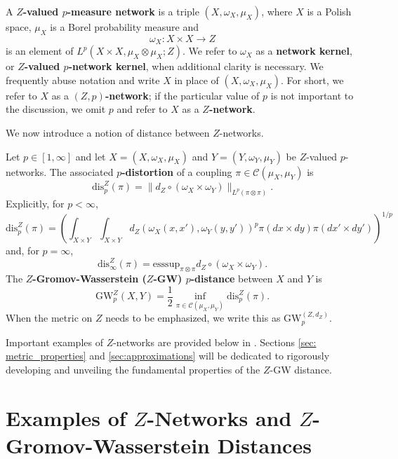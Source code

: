 \documentclass[twoside,11pt]{article}
\theoremstyle{definition}
\newcommand{\dgwz}{\mathrm{GW}_p^Z}
\newcommand{\disp}{\mathrm{dis}_p}
\newcommand{\define}[1]{\textbf{#1}}
\begin{document}
\begin{definition}[$Z$-Network]
    A \define{$Z$-valued $p$-measure network} is a triple $(X,\omega_X,\mu_X)$, where $X$ is a Polish space, $\mu_X$ is a Borel probability measure and
    \[
        \omega_X:X \times X \to Z
    \]
    is an element of $L^p(X\times X, \mu_X\otimes \mu_X; Z)$. We refer to $\omega_X$ as a \define{network kernel}, or \define{$Z$-valued $p$-network kernel}, when additional clarity is necessary. We frequently abuse notation and write $X$ in place of $(X,\omega_X,\mu_X)$. For short, we refer to $X$ as a \define{$(Z,p)$-network}; if the particular value of $p$ is not important to the discussion, we omit $p$ and refer to $X$ as a \define{$Z$-network}.
\end{definition}

We now introduce a notion of distance between $Z$-networks.


\begin{definition}\label{def:ZGW_distance}
     Let $p \in [1,\infty]$ and let $X = (X,\omega_X,\mu_X)$ and $Y = (Y,\omega_Y,\mu_Y)$ be $Z$-valued $p$-networks. The associated \define{$p$-distortion} of a coupling $\pi \in \mathcal{C}(\mu_X,\mu_Y)$ is
    \[
        \mathrm{dis}^Z_p(\pi) = \|d_Z \circ (\omega_X \times \omega_Y) \|_{L^p(\pi \otimes \pi)}.
    \]
    Explicitly, for $p < \infty$,
    \[
        \mathrm{dis}^Z_p(\pi) = \left(\int_{X \times Y} \int_{X \times Y} d_Z(\omega_X(x,x'),\omega_Y(y,y'))^p \pi(dx \times dy) \pi(dx' \times dy')\right)^{1/p}
    \]
    and, for $p = \infty$,
    \[
        \mathrm{dis}^Z_\infty(\pi) = \mathrm{esssup}_{\pi \otimes \pi} d_Z \circ (\omega_X \times \omega_Y).
    \]
    The \define{$Z$-Gromov-Wasserstein ($Z$-GW) $p$-distance} between $X$ and $Y$ is
    \[
        \dgwz (X,Y) = \frac{1}{2} \inf_{\pi \in \mathcal{C}(\mu_X,\mu_Y)} \disp^Z (\pi).
    \]
    When the metric on $Z$ needs to be emphasized, we write this as $\mathrm{GW}_p^{(Z,d_Z)}$. 
\end{definition}

Important examples of $Z$-networks are provided below in . Sections \ref{sec: metric_properties} and \ref{sec:approximations} will be dedicated to rigorously developing and unveiling the fundamental properties of the $Z$-GW distance.


\section{Examples of \texorpdfstring{$Z$}{Z}-Networks and \texorpdfstring{$Z$}{Z}-Gromov-Wasserstein Distances}\label{sec:examples}
\end{document}
